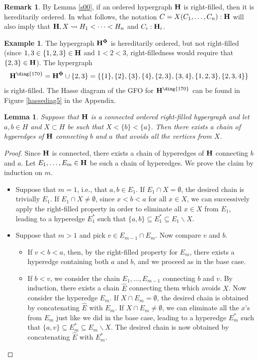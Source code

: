 \documentclass{article}
\theoremstyle{plain}
\newtheorem{lemma}[thm]{Lemma}
\theoremstyle{definition}
\newtheorem{remark}[thm]{Remark}
\newtheorem{example}[thm]{\sc Example}
\newcommand{\hyper}[1]{{\bf #1}}
\begin{document}
 \begin{remark}
By Lemma \ref{s00}, if an ordered hypergraph ${\bf H}$ is right-filled, then it is hereditarily ordered. In what follows, the notation $C=X(C_1,\dots,C_n):{\bf H}$ will also imply that ${\bf H},X\leadsto H_1<\cdots <H_n$ and $C_i:{\bf H}_i$. 
\end{remark}

\begin{example} The hypergraph $\hyper{H}^\maltese$ is hereditarily ordered, but not right-filled (since $1,3\in \{1,2,3\}\in{\bf H}$ and $1<2<3$, right-filledness would require that $\{2,3\}\in{\bf H}$). The hypergraph $$\hyper{H}^{\text{\ding{170}}}= \hyper{H}^\maltese\cup \{2,3\}=\{\{1\},\{2\},\{3\},\{4\},\{2,3\},\{3,4\},\{1,2,3\},\{2,3,4\}\}$$ is right-filled. The Hasse diagram of the GFO for $\hyper{H}^{\text{\ding{170}}}$ can be found in Figure \ref{hassediag5} in the Appendix. 
\end{example}

\begin{lemma}\label{s11}
Suppose that ${\bf H}$ is a connected ordered right-filled hypergraph and let $a,b\in H$ and $X\subset H$ be such that $X<\{b\}<\{a\}$. Then there exists a chain of hyperedges of ${\bf H}$ connecting $b$ and $a$ that avoids all the vertices from $X$.
\end{lemma}
\begin{proof}
Since ${\bf H}$ is connected, there exists a chain of hyperedges of ${\bf H}$ connecting $b$ and $a$. Let $E_1,\dots ,E_m\in{\bf H}$ be such a chain of hyperedges.
We prove the claim by induction on $m$.
\begin{itemize}
\item Suppose that $m=1$, i.e., that $a,b\in E_1$. If $E_1\cap X=\emptyset$, the desired chain is trivially $E_1$. If $E_1\cap X\neq\emptyset$, since $x<b<a$ for all $x\in X$, we can successively apply the right-filled property in order to eliminate all $x\in X$ from $E_1$, leading to a hyperedge $E^{\ast}_1$ such that $\{a,b\}\subseteq E^{\ast}_1\subseteq E_1\backslash X$. 
\item Suppose that $m>1$ and pick $v\in E_{m-1}\cap E_m$. Now compare $v$ and $b$.
\begin{itemize}
 \item If $v<b<a$, then, by the right-filled property for $E_m$, there exists a hyperedge containing both $a$ and $b$, and we proceed as in the base case.
\item If $b< v$, we consider the chain $E_1,\dots ,E_{m-1}$ connecting $b$ and $v$. By induction, there exists a chain $\hat{E}$ connecting them which avoids $X$. Now consider the hyperedge $E_m$. If $X\cap E_m= \emptyset$, the desired chain is obtained by concatenating $\hat{E}$ with $E_m$. If $X\cap E_m\neq \emptyset$, we can eliminate all the $x$'s from $E_m$ just like we did in the base case, leading to a hyperedge $E^{\ast}_m$ such that $\{a,v\}\subseteq E^{\ast}_m\subseteq E_m\backslash X$. The desired chain is now obtained by concatenating $\hat{E}$ with $E^{\ast}_m$.
\end{itemize}
\end{itemize}
\end{proof}
\end{document}
